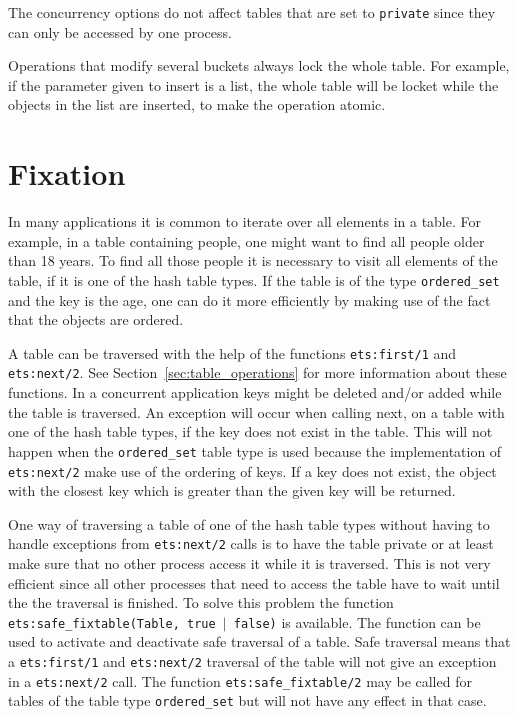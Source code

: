 \documentclass[aps,pre,preprint,nofootinbib]{revtex4}
\begin{document}
The concurrency options do not affect tables that are set to \verb|private| since they can only be accessed by one process.

Operations that modify several buckets always lock the whole table.
For example, if the parameter given to insert is a list, the whole table will be locket while the objects in the list are inserted, to make the operation atomic.

\section{Fixation}
\label{sec:fixation}

In many applications it is common to iterate over all elements in a table.
For example, in a table containing people, one might want to find all people older than 18 years.
To find all those people it is necessary to visit all elements of the table, if it is one of the hash table types.
If the table is of the type \verb|ordered_set| and the key is the age, one can do it more efficiently by making use of the fact that the objects are ordered.

A table can be traversed with the help of the functions \verb|ets:first/1| and \verb|ets:next/2|.
See Section~\ref{sec:table_operations} for more information about these functions.
In a concurrent application keys might be deleted and/or added while the table is traversed.
An exception will occur when calling next, on a table with one of the hash table types, if the key does not exist in the table.
This will not happen when the \verb|ordered_set| table type is used because the implementation of  \verb|ets:next/2| make use of the ordering of keys.
If a key does not exist, the object with the closest key which is greater than the given key will be returned.

One way of traversing a table of one of the hash table types without having to handle exceptions from \verb|ets:next/2| calls is to have the table private or at least make sure that no other process access it while it is traversed.
This is not very efficient since all other processes that need to access the table have to wait until the the traversal is finished.
To solve this problem the function \texttt{ets:safe\_fixtable(Table, true $|$ false)} is available.
The function can be used to activate and deactivate safe traversal of a table. 
Safe traversal means that a \verb|ets:first/1| and \verb|ets:next/2| traversal of the table will not give an exception in a \verb|ets:next/2| call.
The function \verb|ets:safe_fixtable/2| may be called for tables of the table type \verb|ordered_set| but will not have any effect in that case.
\end{document}
